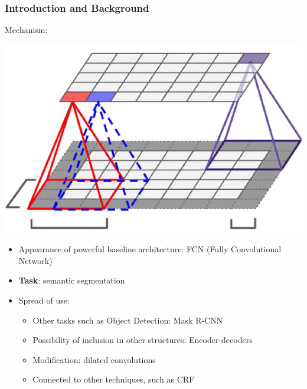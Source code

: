 \documentclass{beamer}
\begin{document}
\begin{frame}
\frametitle{Introduction and Background}

Mechanism:

\begin{center}
\includegraphics[scale=0.2]{convolution.png}
\end{center}

\begin{itemize}
\item Appearance of powerful baseline architecture: FCN (Fully Convolutional Network)
\item \textbf{Task}: semantic segmentation
\item Spread of use:
\begin{itemize}
\item Other tasks such as Object Detection: Mask R-CNN
\item Possibility of inclusion in other structures: Encoder-decoders
\item Modification: dilated convolutions
\item Connected to other techniques, such as CRF
\end{itemize}
\end{itemize}

\end{frame}

\end{document}
